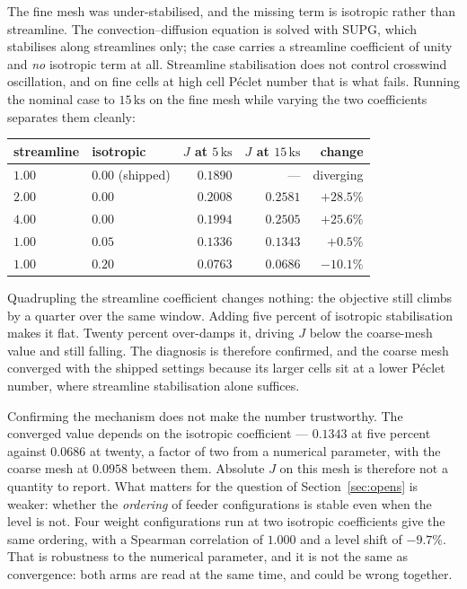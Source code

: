 \documentclass[11pt,a4paper]{article}
\theoremstyle{plain}
\theoremstyle{definition}
\theoremstyle{remark}
\begin{document}
The fine mesh was under-stabilised, and the missing term is isotropic rather than
streamline. The convection--diffusion equation is solved with SUPG, which
stabilises along streamlines only; the case carries a streamline coefficient of
unity and \emph{no} isotropic term at all. Streamline stabilisation does not
control crosswind oscillation, and on fine cells at high cell P\'eclet number
that is what fails. Running the nominal case to $15\,\mathrm{ks}$ on the fine
mesh while varying the two coefficients separates them cleanly:

\begin{center}
\small
\begin{tabular}{@{}llrrr@{}}
\toprule
streamline & isotropic & $J$ at $5\,\mathrm{ks}$ & $J$ at $15\,\mathrm{ks}$ & change \\
\midrule
$1.00$ & $0.00$ (shipped) & $0.1890$ & --- & diverging \\
$2.00$ & $0.00$ & $0.2008$ & $0.2581$ & $+28.5\%$ \\
$4.00$ & $0.00$ & $0.1994$ & $0.2505$ & $+25.6\%$ \\
$1.00$ & $\mathbf{0.05}$ & $0.1336$ & $0.1343$ & $\mathbf{+0.5\%}$ \\
$1.00$ & $0.20$ & $0.0763$ & $0.0686$ & $-10.1\%$ \\
\bottomrule
\end{tabular}
\end{center}

Quadrupling the streamline coefficient changes nothing: the objective still
climbs by a quarter over the same window. Adding five percent of isotropic
stabilisation makes it flat. Twenty percent over-damps it, driving $J$ below the
coarse-mesh value and still falling. The diagnosis is therefore confirmed, and
the coarse mesh converged with the shipped settings because its larger cells sit
at a lower P\'eclet number, where streamline stabilisation alone suffices.

Confirming the mechanism does not make the number trustworthy. The converged
value depends on the isotropic coefficient --- $0.1343$ at five percent against
$0.0686$ at twenty, a factor of two from a numerical parameter, with the coarse
mesh at $0.0958$ between them. Absolute $J$ on this mesh is therefore not a
quantity to report. What matters for the question of
Section~\ref{sec:opens} is weaker: whether the \emph{ordering} of feeder
configurations is stable even when the level is not. Four weight configurations
run at two isotropic coefficients give the same ordering, with a Spearman
correlation of $1.000$ and a level shift of $-9.7\%$. That is robustness to the
numerical parameter, and it is not the same as convergence: both arms are read at
the same time, and could be wrong together.
\end{document}
